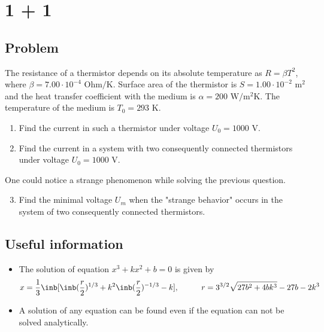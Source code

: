 \section*{1 + 1}

\subsection*{Problem}
The resistance of a thermistor depends on its absolute temperature as
$R = \beta T^2$, where $\beta = 7.00 \cdot 10^{-4}\text{ Ohm/K}$.
Surface area of the thermistor is $S = 1.00 \cdot 10^{-2} \text{ m}^2$ and
the heat transfer coefficient with the medium is $\alpha = 200 \text{ W/m$^2$K}$.
The temperature of the medium is $T_0 = 293 \text{ K}$.

\begin{enumerate}
    \item Find the current in such a thermistor under voltage $U_0 = 1000 \text{ V}$.
    \item Find the current in a system with two consequently connected thermistors
        under voltage $U_0 = 1000 \text{ V}$.
\end{enumerate}

One could notice a strange phenomenon while solving the previous question.

\begin{enumerate}
    \setcounter{enumi}{2}
    \item Find the minimal voltage $U_m$ when the "strange behavior" occurs
    in the system of two consequently connected thermistors.
\end{enumerate}

\subsection*{Useful information}
\begin{itemize}
    \item The solution of equation $x^3 + k x^2 + b = 0$ is given by
        \begin{equation}
            x = \frac{1}{3} \inb[{
                \inb({\frac{r}{2}})^{1/3} +
                k^2 \inb({\frac{r}{2}})^{-1/3} - k}], \hspace{1cm}
            r = 3^{3/2} \sqrt{27 b^2 + 4 b k^3} - 27b - 2 k^3
        \end{equation}
    \item A solution of any equation can be found even if
        the equation can not be solved analytically.
\end{itemize}

